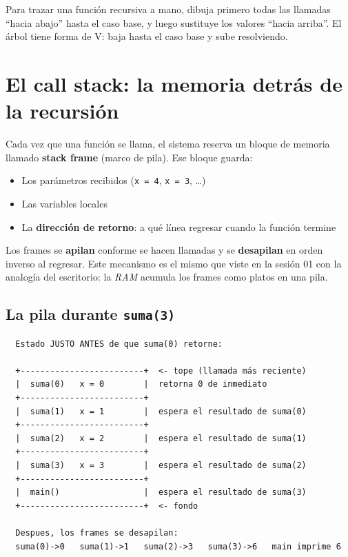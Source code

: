\documentclass[12pt, oneside]{article}
\begin{document}
\begin{consejo}
  Para trazar una función recursiva a mano, dibuja primero todas las
  llamadas ``hacia abajo'' hasta el caso base, y luego sustituye los
  valores ``hacia arriba''.  El árbol tiene forma de V: baja hasta
  el caso base y sube resolviendo.
\end{consejo}

\section{El call stack: la memoria detrás de la recursión}

Cada vez que una función se llama, el sistema reserva un bloque de memoria
llamado \textbf{stack frame} (marco de pila).  Ese bloque guarda:

\begin{itemize}
  \item Los parámetros recibidos (\texttt{x = 4}, \texttt{x = 3}, \ldots)
  \item Las variables locales
  \item La \textbf{dirección de retorno}: a qué línea regresar cuando la
        función termine
\end{itemize}

Los frames se \textbf{apilan} conforme se hacen llamadas y se
\textbf{desapilan} en orden inverso al regresar.
Este mecanismo es el mismo que viste en la sesión 01 con la analogía
del escritorio: la \textit{RAM} acumula los frames como platos en una pila.

\subsection{La pila durante \texttt{suma(3)}}

\begin{verbatim}
  Estado JUSTO ANTES de que suma(0) retorne:

  +-------------------------+  <- tope (llamada más reciente)
  |  suma(0)   x = 0        |  retorna 0 de inmediato
  +-------------------------+
  |  suma(1)   x = 1        |  espera el resultado de suma(0)
  +-------------------------+
  |  suma(2)   x = 2        |  espera el resultado de suma(1)
  +-------------------------+
  |  suma(3)   x = 3        |  espera el resultado de suma(2)
  +-------------------------+
  |  main()                 |  espera el resultado de suma(3)
  +-------------------------+  <- fondo

  Despues, los frames se desapilan:
  suma(0)->0   suma(1)->1   suma(2)->3   suma(3)->6   main imprime 6
\end{verbatim}
\end{document}
